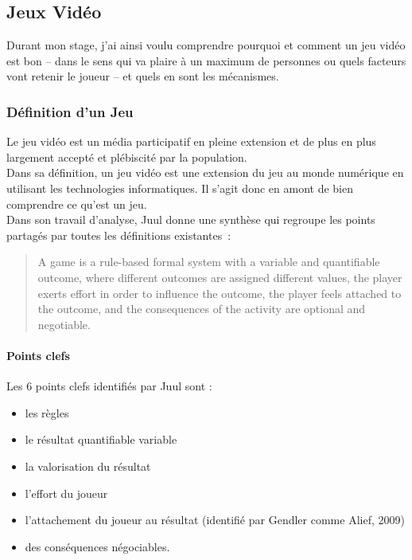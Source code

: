 \subsection{Jeux Vidéo}
Durant mon stage, j'ai ainsi voulu comprendre pourquoi et comment un jeu vidéo est bon – dans le sens qui va plaire à un maximum de personnes ou quels facteurs vont retenir le joueur – et quels en sont les mécanismes. 

	\subsubsection{Définition d'un Jeu}
Le jeu vidéo est un média participatif en pleine extension et de plus en plus largement accepté et plébiscité par la population. \\Dans sa définition, un jeu vidéo est une extension du jeu au monde numérique en utilisant les technologies informatiques. Il s'agit donc en amont de bien comprendre ce qu'est un jeu. \\Dans son travail d’analyse, Juul\cite{Juul05} donne une synthèse qui regroupe les points partagés par toutes les définitions existantes~:
\begin{quotation}
A game is a rule-based formal system with a variable and quantifiable outcome, where different outcomes are assigned different values, the player exerts effort in order to influence the outcome, the player feels attached to the outcome, and the consequences of the activity are optional and negotiable. 
\end{quotation}
\paragraph{Points clefs \\}
Les 6 points clefs identifiés par Juul sont :
\begin{itemize}
	\item les règles
	\item le résultat quantifiable variable
	\item la valorisation du résultat
	\item l’effort du joueur
	\item l’attachement du joueur au résultat (identifié par Gendler comme Alief, 2009)
	\item des conséquences négociables.
\end{itemize}

